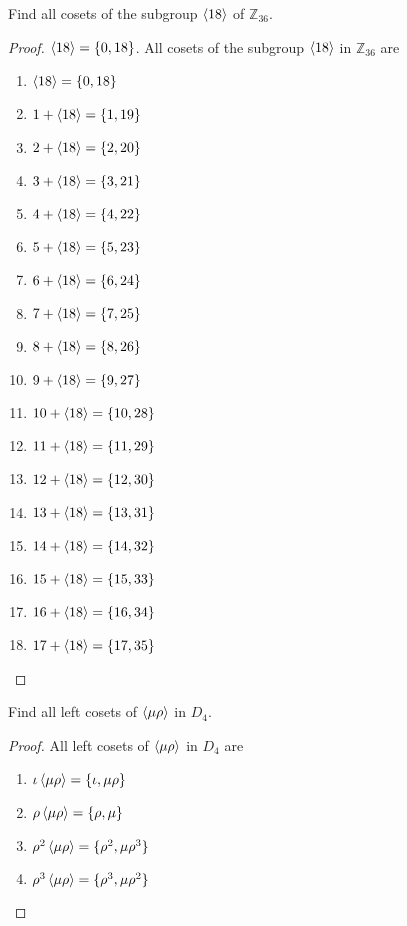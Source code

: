 \newpage
\begin{exercise}
    Find all cosets of the subgroup $\left\langle{18}\right\rangle$ of $\mathbb{Z}_{36}$.
\end{exercise}

\begin{proof}
    $\left\langle{18}\right\rangle = \{ 0, 18 \}$. All cosets of the subgroup $\left\langle{18}\right\rangle$ in $\mathbb{Z}_{36}$ are
    \begin{enumerate}[label={(\arabic*)}]
        \item $\left\langle{18}\right\rangle = \{ 0, 18 \}$
        \item $1 + \left\langle{18}\right\rangle = \{ 1, 19 \}$
        \item $2 + \left\langle{18}\right\rangle = \{ 2, 20 \}$
        \item $3 + \left\langle{18}\right\rangle = \{ 3, 21 \}$
        \item $4 + \left\langle{18}\right\rangle = \{ 4, 22 \}$
        \item $5 + \left\langle{18}\right\rangle = \{ 5, 23 \}$
        \item $6 + \left\langle{18}\right\rangle = \{ 6, 24 \}$
        \item $7 + \left\langle{18}\right\rangle = \{ 7, 25 \}$
        \item $8 + \left\langle{18}\right\rangle = \{ 8, 26 \}$
        \item $9 + \left\langle{18}\right\rangle = \{ 9, 27 \}$
        \item $10 + \left\langle{18}\right\rangle = \{ 10, 28 \}$
        \item $11 + \left\langle{18}\right\rangle = \{ 11, 29 \}$
        \item $12 + \left\langle{18}\right\rangle = \{ 12, 30 \}$
        \item $13 + \left\langle{18}\right\rangle = \{ 13, 31 \}$
        \item $14 + \left\langle{18}\right\rangle = \{ 14, 32 \}$
        \item $15 + \left\langle{18}\right\rangle = \{ 15, 33 \}$
        \item $16 + \left\langle{18}\right\rangle = \{ 16, 34 \}$
        \item $17 + \left\langle{18}\right\rangle = \{ 17, 35 \}$
    \end{enumerate}
\end{proof}

\newpage
\begin{exercise}
    Find all left cosets of $\left\langle{\mu\rho}\right\rangle$ in $D_{4}$.
\end{exercise}

\begin{proof}
    All left cosets of $\left\langle{\mu\rho}\right\rangle$ in $D_{4}$ are
    \begin{enumerate}[label={(\arabic*)}]
        \item $\iota\left\langle{\mu\rho}\right\rangle = \{ \iota, \mu\rho \}$
        \item $\rho\left\langle{\mu\rho}\right\rangle = \{ \rho, \mu \}$
        \item $\rho^{2}\left\langle{\mu\rho}\right\rangle = \{ \rho^{2}, \mu\rho^{3} \}$
        \item $\rho^{3}\left\langle{\mu\rho}\right\rangle = \{ \rho^{3}, \mu\rho^{2} \}$
    \end{enumerate}
\end{proof}

